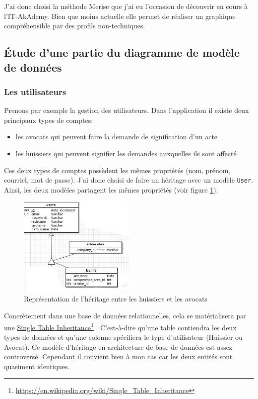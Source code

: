 \documentclass[]{report}
\newcommand\fnurl[2]{%
  \href{#1}{#2}\footnote{\url{#1}}%
}
\begin{document}
    J'ai donc choisi la méthode Merise que j'ai eu l'occasion de découvrir en cours à l'IT-AkAdemy. Bien que moins actuelle elle permet de réaliser un graphique compréhensible par des profils non-techniques.

    \subsection{Étude d'une partie du diagramme de modèle de données}

      \subsubsection{Les utilisateurs}

        Prenons par exemple la gestion des utilisateurs. Dans l'application il existe deux principaux types de comptes:

        \begin{itemize}
          \item les avocats qui peuvent faire la demande de signification d'un acte
          \item les huissiers qui peuvent signifier les demandes auxquelles ils sont affecté
        \end{itemize}

        Ces deux types de comptes possèdent les mêmes propriétés (nom, prénom, courriel, mot de passe). J'ai donc choisi de faire un héritage avec un modèle \verb|User|. Ainsi, les deux modèles partagent les mêmes propriétés (voir figure \ref{fig:merise_users}).

        \begin{figure}[h!]
          \centering
          \includegraphics[width=0.5\textwidth]{img/merise_users.png}
          \caption{Représentation de l'héritage entre les huissiers et les avocats}
          \label{fig:merise_users}
        \end{figure}

        Concrètement dans une base de données relationnelles, cela se matérialisera par une \fnurl{https://en.wikipedia.org/wiki/Single_Table_Inheritance}{Single Table Inheritance}. C'est-à-dire qu'une table contiendra les deux types de données et qu'une colonne spécifiera le type d'utilisateur (Huissier ou Avocat). Ce modèle d'héritage en architecture de base de données est assez controversé. Cependant il convient bien à mon cas car les deux entités sont quasiment identiques.
\end{document}
